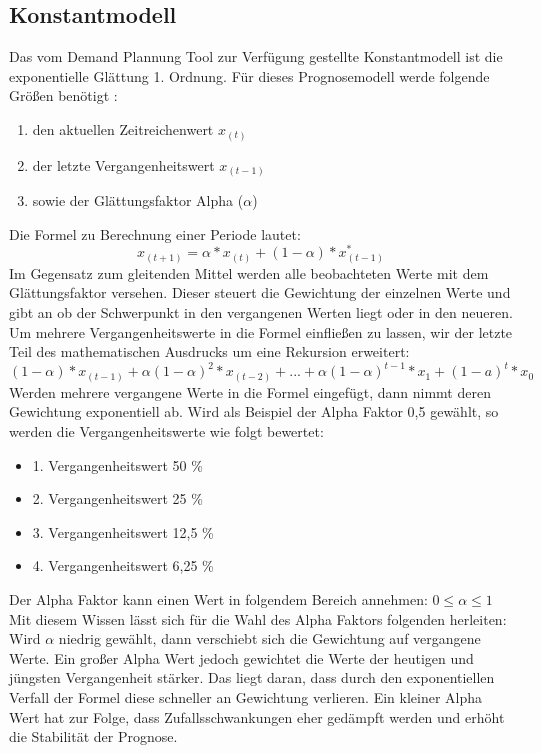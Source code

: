 \subsection{Konstantmodell}
Das vom Demand Plannung Tool zur Verfügung gestellte Konstantmodell ist die exponentielle Glättung 1. Ordnung. Für dieses Prognosemodell werde folgende Größen benötigt \cite[S.~138~ff]{Stadtler:2010:SCM:1965255}:
\begin{enumerate}
	\item den aktuellen Zeitreichenwert \(x_{(t)}\)
	\item der letzte Vergangenheitswert \(x_{(t-1)}\)
	\item sowie der Glättungsfaktor Alpha (\(\alpha\))
\end{enumerate}
Die Formel zu Berechnung einer Periode lautet:
\begin{equation}
	x_{(t+1)} = \alpha * x_{(t)} + (1 - \alpha) * x^*_{(t-1)} 
\end{equation}
Im Gegensatz zum gleitenden Mittel werden alle beobachteten Werte mit dem Glättungsfaktor versehen. Dieser steuert die Gewichtung der einzelnen Werte und gibt an ob der Schwerpunkt in den vergangenen Werten liegt oder in den neueren.
Um mehrere Vergangenheitswerte in die Formel einfließen zu lassen, wir der letzte Teil des mathematischen Ausdrucks um eine Rekursion erweitert:
\begin{equation}
(1 - \alpha) * x_{(t-1)} + \alpha(1 - \alpha)^{2} * x_{(t-2)} + ... + \alpha(1 - \alpha)^{t-1} * x_{1} + (1-a)^t * x_0
\end{equation}
Werden mehrere vergangene Werte in die Formel eingefügt, dann nimmt deren Gewichtung exponentiell ab. Wird als Beispiel der Alpha Faktor 0,5 gewählt, so werden die Vergangenheitswerte wie folgt bewertet:
\begin{itemize}
	\item 1. Vergangenheitswert 50 \%
	\item 2. Vergangenheitswert 25 \%
	\item 3. Vergangenheitswert 12,5 \%
	\item 4. Vergangenheitswert 6,25 \%
\end{itemize}
Der Alpha Faktor kann einen Wert in folgendem Bereich annehmen:
$ 0 \leq \alpha \leq 1 $
Mit diesem Wissen lässt sich für die Wahl des Alpha Faktors folgenden herleiten:
Wird $\alpha$ niedrig gewählt, dann verschiebt sich die Gewichtung auf vergangene Werte. Ein großer Alpha Wert jedoch gewichtet die Werte der heutigen und jüngsten Vergangenheit stärker. Das liegt daran, dass durch den exponentiellen Verfall der Formel diese schneller an Gewichtung verlieren. Ein kleiner Alpha Wert hat zur Folge, dass Zufallsschwankungen eher gedämpft werden und erhöht die Stabilität der Prognose.

